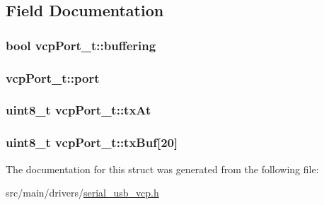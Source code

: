 \subsection{Field Documentation}
\hypertarget{structvcpPort__t_afea07a6631e9aab2a70165599c22dff8}{
\subsubsection[{buffering}]{\setlength{\rightskip}{0pt plus 5cm}bool vcp\+Port\+\_\+t\+::buffering}}\label{structvcpPort__t_afea07a6631e9aab2a70165599c22dff8}
\hypertarget{structvcpPort__t_a0089d108d978241d7f11437160b67e2d}{
\subsubsection[{port}]{ vcp\+Port\+\_\+t\+::port}}\label{structvcpPort__t_a0089d108d978241d7f11437160b67e2d}
\hypertarget{structvcpPort__t_ac68687ac1ea4e6b59496f17ab0316b2b}{
\subsubsection[{tx\+At}]{\setlength{\rightskip}{0pt plus 5cm}uint8\+\_\+t vcp\+Port\+\_\+t\+::tx\+At}}\label{structvcpPort__t_ac68687ac1ea4e6b59496f17ab0316b2b}
\hypertarget{structvcpPort__t_aacdb51830d2928fa4a1e22d94056fea0}{
\subsubsection[{tx\+Buf}]{\setlength{\rightskip}{0pt plus 5cm}uint8\+\_\+t vcp\+Port\+\_\+t\+::tx\+Buf\mbox{[}20\mbox{]}}}\label{structvcpPort__t_aacdb51830d2928fa4a1e22d94056fea0}


The documentation for this struct was generated from the following file\+:\begin{DoxyCompactItemize}
\item 
src/main/drivers/\hyperlink{serial__usb__vcp_8h}{serial\+\_\+usb\+\_\+vcp.\+h}\end{DoxyCompactItemize}
